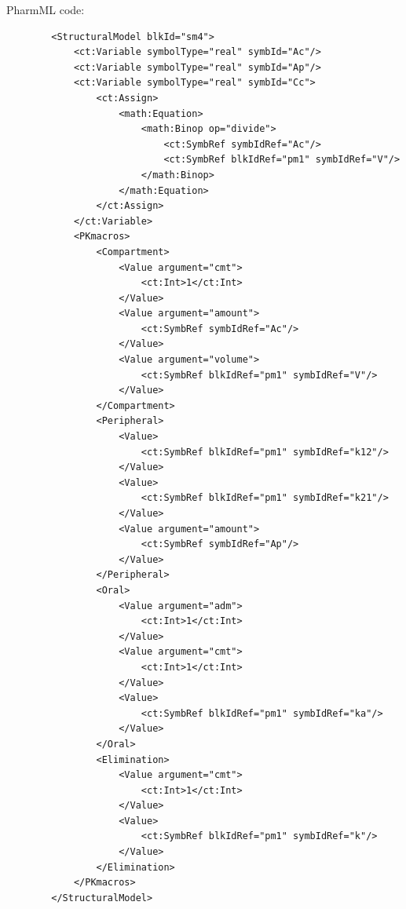 PharmML code:
\lstset{language=XML}
\begin{lstlisting}
        <StructuralModel blkId="sm4">
            <ct:Variable symbolType="real" symbId="Ac"/>
            <ct:Variable symbolType="real" symbId="Ap"/>
            <ct:Variable symbolType="real" symbId="Cc">
                <ct:Assign>
                    <math:Equation>
                        <math:Binop op="divide">
                            <ct:SymbRef symbIdRef="Ac"/>
                            <ct:SymbRef blkIdRef="pm1" symbIdRef="V"/>
                        </math:Binop>
                    </math:Equation>
                </ct:Assign>
            </ct:Variable>
            <PKmacros>
                <Compartment>
                    <Value argument="cmt">
                        <ct:Int>1</ct:Int>
                    </Value>
                    <Value argument="amount">
                        <ct:SymbRef symbIdRef="Ac"/>
                    </Value>
                    <Value argument="volume">
                        <ct:SymbRef blkIdRef="pm1" symbIdRef="V"/>
                    </Value>
                </Compartment>
                <Peripheral>
                    <Value>
                        <ct:SymbRef blkIdRef="pm1" symbIdRef="k12"/>
                    </Value>
                    <Value>
                        <ct:SymbRef blkIdRef="pm1" symbIdRef="k21"/>
                    </Value>
                    <Value argument="amount">
                        <ct:SymbRef symbIdRef="Ap"/>
                    </Value>
                </Peripheral>
                <Oral>
                    <Value argument="adm">
                        <ct:Int>1</ct:Int>
                    </Value>
                    <Value argument="cmt">
                        <ct:Int>1</ct:Int>
                    </Value>
                    <Value>
                        <ct:SymbRef blkIdRef="pm1" symbIdRef="ka"/>
                    </Value>
                </Oral>
                <Elimination>
                    <Value argument="cmt">
                        <ct:Int>1</ct:Int>
                    </Value>
                    <Value>
                        <ct:SymbRef blkIdRef="pm1" symbIdRef="k"/>
                    </Value>
                </Elimination>
            </PKmacros>
        </StructuralModel>
\end{lstlisting}


